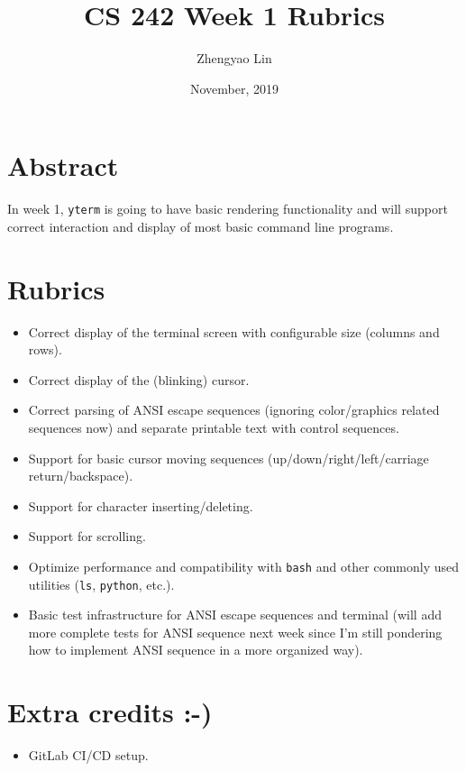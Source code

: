 \documentclass[11pt]{article}
\begin{document}
    \title{CS 242 Week 1 Rubrics}
    \author{Zhengyao Lin}
    \date{November, 2019}
    \maketitle
    
    \section{Abstract}
        In week 1, \texttt{yterm} is going to have basic rendering functionality and will support correct interaction and display of most basic command line programs.
    
    \section{Rubrics}
        \begin{itemize}
            \item Correct display of the terminal screen with configurable size (columns and rows).
            \item Correct display of the (blinking) cursor.
            \item Correct parsing of ANSI escape sequences (ignoring color/graphics related sequences now) and separate printable text with control sequences.
            \item Support for basic cursor moving sequences (up/down/right/left/carriage return/backspace).
            \item Support for character inserting/deleting.
            \item Support for scrolling.
            \item Optimize performance and compatibility with \texttt{bash} and other commonly used utilities (\texttt{ls}, \texttt{python}, etc.).
            \item Basic test infrastructure for ANSI escape sequences and terminal (will add more complete tests for ANSI sequence next week since I'm still pondering how to implement ANSI sequence in a more organized way).
        \end{itemize}
    
    \section{Extra credits :-)}
        \begin{itemize}
            \item GitLab CI/CD setup.
        \end{itemize}
\end{document}
